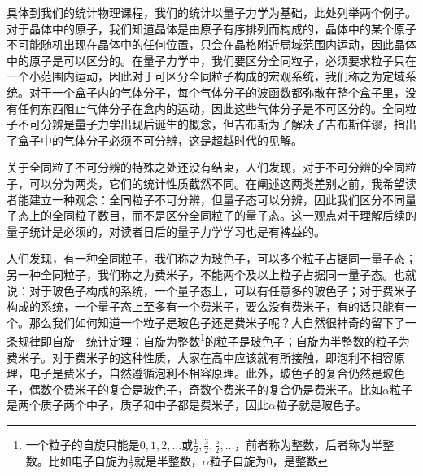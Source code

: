 \documentclass[../../main.tex]{subfiles}
\begin{document}
具体到我们的统计物理课程，我们的统计以量子力学为基础，此处列举两个例子。对于晶体中的原子，我们知道晶体是由原子有序排列而构成的，晶体中的某个原子不可能随机出现在晶体中的任何位置，只会在晶格附近局域范围内运动，因此晶体中的原子是可以区分的。在量子力学中，我们要区分全同粒子，必须要求粒子只在一个小范围内运动，因此对于可区分全同粒子构成的宏观系统，我们称之为定域系统。对于一个盒子内的气体分子，每个气体分子的波函数都弥散在整个盒子里，没有任何东西阻止气体分子在盒内的运动，因此这些气体分子是不可区分的。全同粒子不可分辨是量子力学出现后诞生的概念，但吉布斯为了解决了吉布斯佯谬，指出了盒子中的气体分子必须不可分辨，这是超越时代的见解。

关于全同粒子不可分辨的特殊之处还没有结束，人们发现，对于不可分辨的全同粒子，可以分为两类，它们的统计性质截然不同。在阐述这两类差别之前，我希望读者能建立一种观念：全同粒子不可分辨，但量子态可以分辨，因此我们区分不同量子态上的全同粒子数目，而不是区分全同粒子的量子态。这一观点对于理解后续的量子统计是必须的，对读者日后的量子力学学习也是有裨益的。

人们发现，有一种全同粒子，我们称之为玻色子，可以多个粒子占据同一量子态；另一种全同粒子，我们称之为费米子，不能两个及以上粒子占据同一量子态。也就说：对于玻色子构成的系统，一个量子态上，可以有任意多的玻色子；对于费米子构成的系统，一个量子态上至多有一个费米子，要么没有费米子，有的话只能有一个。那么我们如何知道一个粒子是玻色子还是费米子呢？大自然很神奇的留下了一条规律即自旋—统计定理：自旋为整数\footnote{一个粒子的自旋只能是\(0,1,2,\dots\)或\(\frac{1}{2},\frac{3}{2},\frac{5}{2},\dots\)，前者称为整数，后者称为半整数。比如电子自旋为\(\frac{1}{2}\)就是半整数，\(\alpha\)粒子自旋为0，是整数}的粒子是玻色子；自旋为半整数的粒子为费米子。对于费米子的这种性质，大家在高中应该就有所接触，即泡利不相容原理，电子是费米子，自然遵循泡利不相容原理。此外，玻色子的复合仍然是玻色子，偶数个费米子的复合是玻色子，奇数个费米子的复合仍是费米子。比如\(\alpha\)粒子是两个质子两个中子，质子和中子都是费米子，因此\(\alpha\)粒子就是玻色子。
\end{document}

